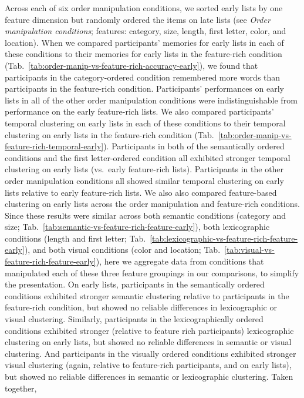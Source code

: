 \documentclass[11pt]{article}
\begin{document}
Across each of six order manipulation conditions, we sorted early lists by one
feature dimension but randomly ordered the items on late lists (see
\textit{Order manipulation conditions}; features: category, size, length, first
letter, color, and location). When we compared participants' memories for early
lists in each of these conditions to their memories for early lists in the
feature-rich condition
(Tab.~\ref{tab:order-manip-vs-feature-rich-accuracy-early}), we found that
participants in the category-ordered condition remembered more words than
participants in the feature-rich condition. Participants' performances on early
lists in all of the other order manipulation conditions were indistinguishable
from performance on the early feature-rich lists. We also compared
participants' temporal clustering on early lists in each of these conditions to
their temporal clustering on early lists in the feature-rich condition
(Tab.~\ref{tab:order-manip-vs-feature-rich-temporal-early}). Participants in
both of the semantically ordered conditions and the first letter-ordered
condition all exhibited stronger temporal clustering on early lists (vs.~early
feature-rich lists). Participants in the other order manipulation conditions
all showed similar temporal clustering on early lists relative to early
feature-rich lists. We also also compared feature-based clustering on early
lists across the order manipulation and feature-rich conditions. Since these
results were similar across both semantic conditions (category and size;
Tab.~\ref{tab:semantic-vs-feature-rich-feature-early}), both lexicographic
conditions (length and first letter;
Tab.~\ref{tab:lexicographic-vs-feature-rich-feature-early}), and both visual
conditions (color and location;
Tab.~\ref{tab:visual-vs-feature-rich-feature-early}), here we aggregate data
from conditions that manipulated each of these three feature groupings in our
comparisons, to simplify the presentation. On early lists, participants in the
semantically ordered conditions exhibited stronger semantic clustering relative
to participants in the feature-rich condition, but showed no reliable
differences in lexicographic or visual clustering. Similarly, participants in
the lexicographically ordered conditions exhibited stronger (relative to
feature rich participants) lexicographic clustering on early lists, but showed
no reliable differences in semantic or visual clustering. And participants in
the visually ordered conditions exhibited stronger visual clustering (again,
relative to feature-rich participants, and on early lists), but showed no
reliable differences in semantic or lexicographic clustering. Taken together,
\end{document}

